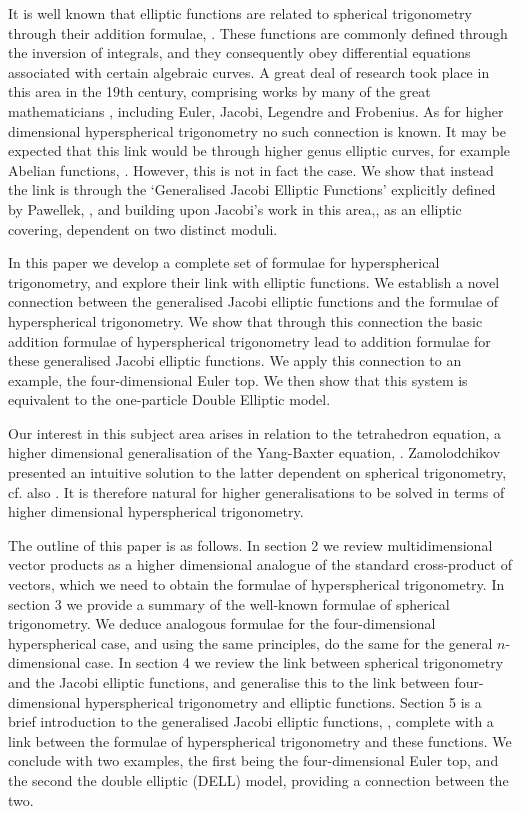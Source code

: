 \documentclass[fleqn,11pt,twoside]{article}
\theoremstyle{definition}
\begin{document}
It is well known that elliptic functions are related to spherical trigonometry through their addition formulae, \cite{Lagrange,Legendre}. These functions are commonly defined through the inversion of integrals, and they consequently obey differential equations associated with certain algebraic curves. A great deal of research took place in this area in the 19th century, comprising  works by many of the great mathematicians , including Euler, Jacobi, Legendre and Frobenius. As for higher dimensional hyperspherical trigonometry no such connection is known. It may be expected that this link would be through higher genus elliptic curves, for example Abelian functions, \cite{baker2}. However, this is not in fact the case. We show that instead the link is through the  `Generalised Jacobi Elliptic Functions' explicitly defined by Pawellek, \cite{pawellek}, and building upon Jacobi's work in this area,\cite{Jacobi}, as an elliptic covering, dependent on two distinct moduli.

In this paper we develop a complete set of formulae for hyperspherical trigonometry, and explore their link with elliptic 
functions. We establish a novel connection between the generalised Jacobi elliptic functions and the formulae of hyperspherical trigonometry. We show that through this connection the basic addition formulae of hyperspherical trigonometry lead to addition formulae for these generalised Jacobi elliptic functions. We apply this connection to an example, the four-dimensional Euler top. We then show that this system is equivalent to the one-particle Double Elliptic model.

Our interest in this subject area arises in relation to the tetrahedron equation, a higher dimensional generalisation of the Yang-Baxter equation, \cite{Zamolodchikov}. Zamolodchikov presented an intuitive solution to the latter dependent on spherical trigonometry, cf. also \cite{Baxter}. It is therefore natural for higher generalisations to be solved in terms of higher dimensional hyperspherical trigonometry.

The outline of this paper is as follows. In section 2 we review multidimensional vector products as a higher dimensional analogue of the standard cross-product of vectors, which we need to obtain the formulae of hyperspherical trigonometry. In section 3 we provide a summary of the well-known formulae of spherical trigonometry. We deduce analogous formulae for the four-dimensional hyperspherical case, and  using the same principles, do the same for the general $n$-dimensional case.  In section 4 we review the link between spherical trigonometry and the Jacobi elliptic functions, and generalise this to the link between four-dimensional hyperspherical trigonometry and elliptic functions. Section 5 is a brief introduction to the generalised Jacobi elliptic functions, \cite{pawellek}, complete with a link between the formulae of hyperspherical trigonometry and these functions. We conclude with two examples, the first being the four-dimensional Euler top, and the second the double elliptic (DELL) model, providing a connection between the two.
\end{document}
